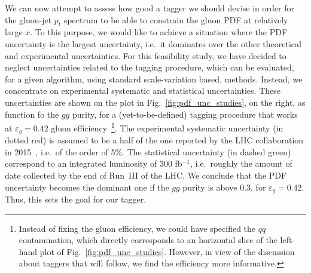 We can now attempt to assess how good a tagger we should devise in order for the gluon-jet $p_t$ spectrum to be able to constrain the gluon PDF at relatively large $x$. To this purpose, we would like to achieve a situation where the PDF uncertainty is the largest uncertainty, i.e.\ it dominates over the other theoretical and experimental uncertainties. For this feasibility study, we have decided to neglect uncertainties related to the tagging procedure, which can be evaluated, for a given algorithm, using standard scale-variation based, methods. Instead, we concentrate on experimental systematic and statistical uncertainties. These uncertainties are shown on the plot in Fig.~\ref{fig:pdf_unc_studies}, on the right, as function fo the $gg$ purity, for a (yet-to-be-defined) tagging procedure that works at $\varepsilon_g=0.42$ gluon efficiency~\footnote{Instead of fixing the gluon efficiency, we could have specified the $qq$ contamination, which directly corresponds to an horizontal slice of the left-hand plot of Fig.~\ref{fig:pdf_unc_studies}. However, in view of the discussion about taggers that will follow, we find the efficiency more informative.}. 
%
The experimental systematic uncertainty (in dotted red)  is assumed to be a half of the one reported by the LHC collaboration in 2015~\cite{Aaboud:2017jcu}, i.e.\ of the order of 5\%. The statistical uncertainty (in dashed green) correspond to an integrated luminosity of 300 fb$^{-1}$, i.e.\ roughly the amount of date collected by the end of Run~III of the LHC.
%
We conclude that the PDF uncertainty becomes the dominant one if the $gg$ purity is above 0.3, for $\varepsilon_g=0.42$. Thus, this sets the goal for our tagger.

